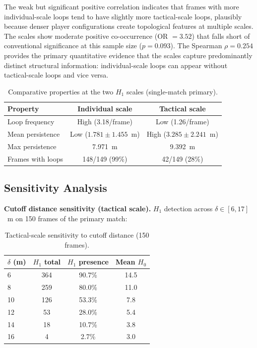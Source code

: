 The weak but significant positive correlation indicates that frames with more individual-scale loops tend to have slightly more tactical-scale loops, plausibly because denser player configurations create topological features at multiple scales. The scales show moderate positive co-occurrence (OR \(=3.52\)) that falls short of conventional significance at this sample size (\(p=0.093\)). The Spearman \(\rho=0.254\) provides the primary quantitative evidence that the scales capture predominantly distinct structural information: individual-scale loops can appear without tactical-scale loops and vice versa.

\begin{table}[H]
  \centering
  \caption{Comparative properties at the two \(H_1\) scales (single-match primary).}
  \label{tab:complement}
  \begin{tabular}{@{}lcc@{}}
    \toprule
    Property & Individual scale & Tactical scale \\
    \midrule
    Loop frequency & High (3.18/frame) & Low (1.26/frame) \\
    Mean persistence & Low (\(1.781\pm1.455\)~m) & High (\(3.285\pm2.241\)~m) \\
    Max persistence & 7.971~m & 9.392~m \\
    Frames with loops & 148/149 (99\%) & 42/149 (28\%) \\
    \bottomrule
  \end{tabular}
\end{table}

\subsection{Sensitivity Analysis}
\label{sec:sensitivity}

\textbf{Cutoff distance sensitivity (tactical scale).} \(H_1\) detection across \(\delta\in[6,17]\)~m on 150 frames of the primary match:

\begin{table}[H]
  \centering
  \caption{Tactical-scale sensitivity to cutoff distance (150 frames).}
  \label{tab:senscut}
  \begin{tabular}{@{}lccc@{}}
    \toprule
    \(\delta\) (m) & \(H_1\) total & \(H_1\) presence & Mean \(H_0\) \\
    \midrule
    6  & 364 & 90.7\% & 14.5 \\
    8  & 259 & 80.0\% & 11.0 \\
    10 & 126 & 53.3\% & 7.8 \\
    12 & 53  & 28.0\% & 5.4 \\
    14 & 18  & 10.7\% & 3.8 \\
    16 & 4   & 2.7\%  & 3.0 \\
    \bottomrule
  \end{tabular}
\end{table}

